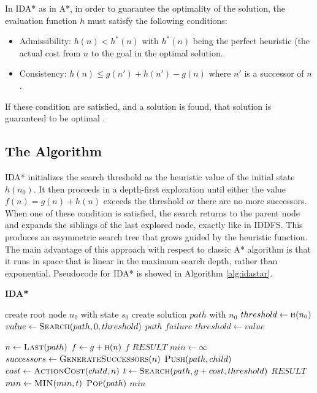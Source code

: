\medskip\noindent
In IDA* as in A*, in order to guarantee the optimality of the solution, the evaluation function $h$ must satisfy the following conditions:
\begin{itemize}
    \item Admissibility: $h(n)<h^*(n)$  with $h^*(n)$ being the perfect heuristic (the actual cost from $n$ to the goal in the optimal solution.
    \item Consistency: $h(n)\leq g(n') + h(n') -g(n)$ where $n'$ is a successor of $n$. 
\end{itemize}
If these condition are satisfied, and a solution is found, that solution is guaranteed to be optimal \cite{Hart1968}.

\subsection{The Algorithm}
IDA* initializes the search threshold as the heuristic value of the initial state $h(n_0)$. It then proceeds in a depth-first exploration until either the value $f(n) = g(n) + h(n)$ exceeds the threshold or there are no more successors. When one of these condition is satisfied, the search returns to the parent node and expands the siblings of the last explored node, exactly like in IDDFS. This produces an asymmetric search tree that grows guided by the heuristic function. The main advantage of this approach with respect to classic A* algorithm is that it runs in space that is linear in the maximum search depth, rather than exponential. Pseudocode for IDA* is showed in Algorithm \ref{alg:idastar}.

\begin{algorithm}
  \caption[IDA*]{\textbf{IDA*}}\label{alg:idastar}
  \begin{algorithmic}
        \State create root node $n_0$ with state $s_0$
        \State create solution $path$ with $n_0$
        \State $threshold \gets \Call{h}{n_0}$
                \State $value \gets \Call{Search}{path,0,threshold}$
            \Return $path$
            \EndIf
            \Return $failure$
            \EndIf
            \State $threshold\gets value$
        \EndWhile
    \EndFunction
    
        \State $n\gets \Call{Last}{path}$
        \State $f \gets g+\Call{h}{n}$
            \Return $f$
        \EndIf
            \Return $RESULT$
        \EndIf
        \State $min\gets\infty$
        \State $successors \gets \Call{GenerateSuccessors}{n}$
            \State $\Call{Push}{path, child}$
            \State $cost \gets \Call{ActionCost}{child,n}$
            \State $t \gets \Call{Search}{path, g + cost , threshold}$
                \Return $RESULT$
            \EndIf
            \State $min\gets \Call{MIN}{min,t}$
            \State $\Call{Pop}{path}$
        \EndFor
        \Return $min$
    \EndFunction
  \end{algorithmic}
\end{algorithm}

